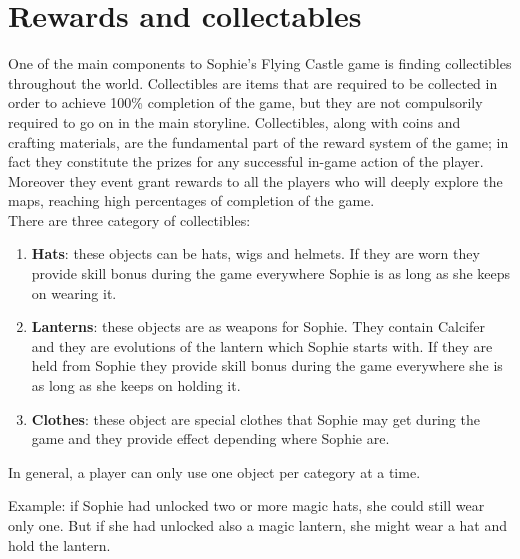 \section{Rewards and collectables}
One of the main components to Sophie's Flying Castle game is finding collectibles throughout the world.
Collectibles are items that are required to be collected in order to achieve 100\%
completion of the game, but they are not compulsorily required to go on in the main storyline. Collectibles, along with coins and crafting materials, are the fundamental part of the reward system of the game; in fact they constitute the prizes for any successful in-game action of the player. Moreover they event grant rewards to all the players who will deeply explore the maps, reaching high percentages of completion of the game.\\

There are three category of collectibles:
\begin{enumerate}
\item \textbf{Hats}: these objects can be hats, wigs and helmets. If they are worn they provide skill bonus during the game everywhere Sophie is as long as she keeps on wearing it.
\item \textbf{Lanterns}: these objects are as weapons for Sophie. They contain Calcifer and they are evolutions of the lantern which Sophie starts with. If they are held from Sophie they provide skill bonus during the game everywhere she is as long as she keeps on holding it.
\item \textbf{Clothes}: these object are special clothes that Sophie may get during the game and they provide effect depending where Sophie are.  
  \end{enumerate}

In general, a player can only use one object per category at a time.

Example: if Sophie had unlocked two or more magic hats, she could still wear only one. But if she had unlocked also a magic lantern, she might wear a hat and hold the lantern.

